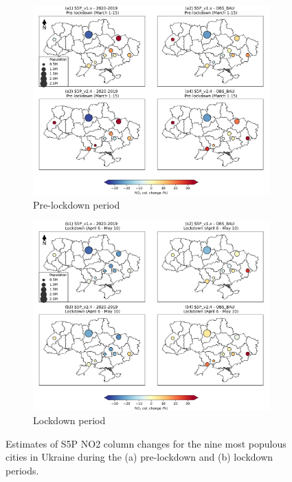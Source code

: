 \begin{figure}[p]
    \centering
    \begin{subfigure}{\textwidth}
      \centering
      \includegraphics[width=.8\textwidth]{figs/chap3/fig5_a.png}
      \caption{Pre-lockdown period}
      \label{fig:fig5a}
    \end{subfigure}

    \begin{subfigure}{\textwidth}
      \centering
      \includegraphics[width=.8\textwidth]{figs/chap3/fig5_b.png}
      \caption{Lockdown period}
      \label{fig:fig5b}
    \end{subfigure}
    \caption{Estimates of S5P NO2 column changes for the nine most populous cities in Ukraine during the (a) pre-lockdown and (b) lockdown periods.}
    \label{fig:fig5}
\end{figure}

